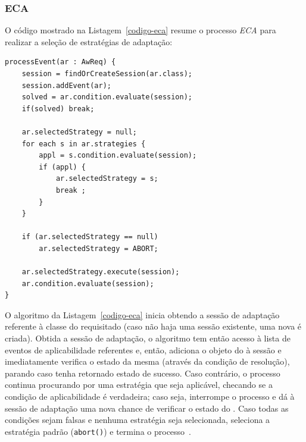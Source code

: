 \subsubsection{ECA}
\label{sec-referencial-zanshin-eca}

O código mostrado na Listagem~\ref{codigo-eca} resume o processo \textit{ECA} para realizar a seleção de estratégias de adaptação:

\begin{lstlisting}[caption={Código do processo ECA},label={codigo-eca}]
processEvent(ar : AwReq) {
	session = findOrCreateSession(ar.class);
	session.addEvent(ar);
	solved = ar.condition.evaluate(session);
	if(solved) break;

	ar.selectedStrategy = null;
	for each s in ar.strategies {
		appl = s.condition.evaluate(session);
		if (appl) {
			ar.selectedStrategy = s;
			break ;
		}
	}

	if (ar.selectedStrategy == null)
		ar.selectedStrategy = ABORT;

	ar.selectedStrategy.execute(session);
	ar.condition.evaluate(session);
}
\end{lstlisting}

O algoritmo da Listagem~\ref{codigo-eca} inicia obtendo a sessão de adaptação referente à classe do \awreq requisitado (caso não haja uma sessão existente, uma nova é criada). Obtida a sessão de adaptação, o algoritmo tem então acesso à lista de eventos de aplicabilidade referentes e, então, adiciona o objeto do \awreq à sessão e imediatamente verifica o estado da mesma (através da condição de resolução), parando caso tenha retornado estado de sucesso. Caso contrário, o processo continua procurando por uma estratégia que seja aplicável, checando se a condição de aplicabilidade é verdadeira; caso seja, interrompe o processo e dá à sessão de adaptação uma nova chance de verificar o estado do \awreq. Caso todas as condições sejam falsas e nenhuma estratégia seja selecionada, seleciona a estratégia padrão (\texttt{abort()}) e termina o processo~\cite{tesevitor}. 


